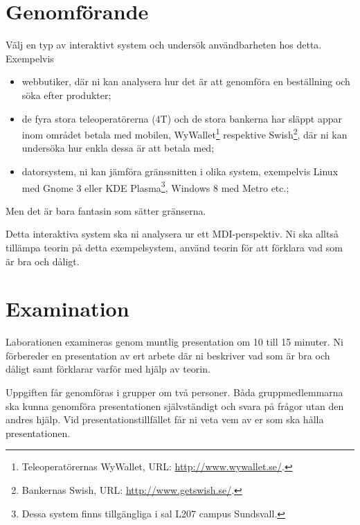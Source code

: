 \documentclass[a4paper,logo,nocourse]{miunasgn}
\begin{document}
\section{Genomförande}
\label{sec:Genomforande}
Välj en typ av interaktivt system och undersök användbarheten hos detta.
Exempelvis
\begin{itemize}
  \item webbutiker, där ni kan analysera hur det är att genomföra en 
    beställning och söka efter produkter;
  \item de fyra stora teleoperatörerna (4T) och de stora bankerna har släppt 
    appar inom området betala med mobilen, WyWallet\footnote{%
      Teleoperatörernas WyWallet, URL: \url{http://www.wywallet.se/}.
    } respektive Swish\footnote{%
      Bankernas Swish, URL: \url{http://www.getswish.se/}.
    }, där ni kan undersöka hur enkla dessa är att betala med;
  \item datorsystem, ni kan jämföra gränssnitten i olika system, exempelvis 
    Linux med Gnome 3 eller KDE Plasma\footnote{%
      Dessa system finns tillgängliga i sal L207 campus Sundsvall.
    }, Windows 8 med Metro etc.;
\end{itemize}
Men det är bara fantasin som sätter gränserna.

Detta interaktiva system ska ni analysera ur ett MDI-perspektiv.
Ni ska alltså tillämpa teorin på detta exempelsystem, använd teorin för att 
förklara vad som är bra och dåligt.


\section{Examination}
\label{sec:Examination}
Laborationen examineras genom muntlig presentation om 10 till 15 minuter.
Ni förbereder en presentation av ert arbete där ni beskriver vad som är bra och 
dåligt samt förklarar varför med hjälp av teorin.

Uppgiften får genomföras i grupper om två personer.
Båda gruppmedlemmarna ska kunna genomföra presentationen självständigt och 
svara på frågor utan den andres hjälp.
Vid presentationstillfället får ni veta vem av er som ska hålla presentationen.


\printbibliography
\end{document}
